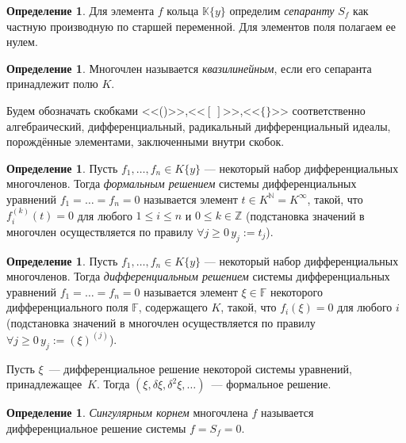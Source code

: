 \documentclass[16pt]{article}
\renewcommand{\ge}{\geqslant} %
\theoremstyle{plain1}
\theoremstyle{plain2}
\theoremstyle{plain}
\theoremstyle{plain3}
\theoremstyle{definition}
\newtheorem{definition}[theorem2]{Определение}
\theoremstyle{remark}
\begin{document}
\begin{definition}
Для элемента $f$ кольца $\mathbb{K}\{y\}$ определим \emph{сепаранту} $S_f$
как частную производную по старшей переменной. Для элементов поля полагаем ее нулем.
\end{definition}

\begin{definition} Многочлен называется \emph{квазилинейным}, если
его сепаранта принадлежит полю $K$.
\end{definition}



Будем обозначать скобками <<()>>,<<$[~]$>>,<<$\{\}$>> соответственно
алгебраический, дифференциальный, радикальный дифференциальный
идеалы, порождённые элементами, заключенными внутри скобок.


\begin{definition}
Пусть $f_1,\ldots,f_n\in K\{y\}$ --- некоторый набор
дифференциальных многочленов. Тогда \emph{формальным решением}
системы дифференциальных уравнений $f_1=\ldots =f_n=0$ называется
элемент $t\in K^{\mathbb{N}}= K^{\infty}$, такой, что $  f_i^{(k)}(t)=0$ для
любого $1\leqslant i\leqslant n$ и $0\leqslant k\in \mathbb{Z}$ (подстановка значений в
многочлен осуществляется по правилу $\forall j\ge 0 \, y_j:=t_j$).
\end{definition}




\begin{definition}
Пусть $f_1,\ldots,f_n\in K\{y\}$ --- некоторый
набор дифференциальных многочленов. Тогда \emph{дифференциальным
решением} системы дифференциальных уравнений $f_1=\ldots =f_n=0$
называется элемент $\xi \in \mathbb{F}$ некоторого дифференциального
поля $\mathbb{F}$, содержащего $K$, такой, что $ f_i(\xi)=0$ для
любого $i$ (подстановка значений в
многочлен осуществляется по правилу $\forall j\ge 0 \, y_j:=(\xi)^{(j)}$).
\end{definition}

Пусть $\xi$~--- дифференциальное решение некоторой системы уравнений, принадлежащее~$K$.
Тогда $(\xi, \delta \xi, \delta^2 \xi, \ldots)$~--- формальное решение.

\begin{definition} \emph{Сингулярным корнем} многочлена $f$
называется дифференциальное решение системы $f=S_f=0$.
\end{definition}
\end{document}
